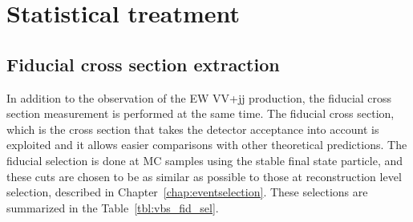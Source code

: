 \chapter{Statistical treatment}
\label{chap:statistics}

\section{Fiducial cross section extraction}
In addition to the observation of the EW VV+jj production, the fiducial cross section measurement is performed at the same time.
The fiducial cross section, which is the cross section that takes the detector acceptance into account is exploited and it allows easier comparisons with other theoretical predictions.
The fiducial selection is done at MC samples using the stable final state particle, and these cuts are chosen to be as similar as possible to those at reconstruction level selection, described in Chapter~\ref{chap:eventselection}.
These selections are summarized in the Table~\ref{tbl:vbs_fid_sel}. 


